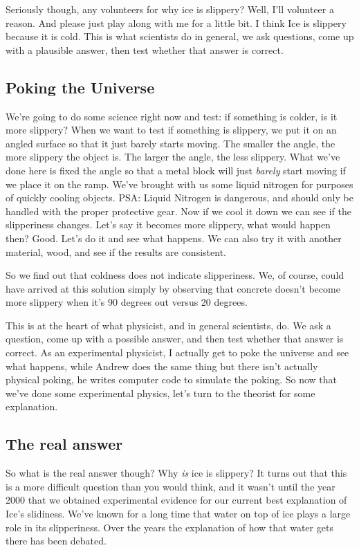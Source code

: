 \documentclass[12pt]{article}
\begin{document}
Seriously
though, any volunteers for why ice is slippery? Well, I'll volunteer a reason. And please 
just play along with me for a little bit. I think Ice is slippery because it is cold.
This is what scientists do in general, we ask questions, come up with a plausible answer, 
then test whether that answer is correct. 

\subsection{Poking the Universe}
We're going to do some science right now 
and test: if something is colder, is it more slippery? When we want to test 
if something is slippery, we put it on an angled surface so that it just barely 
starts moving. The smaller the angle, the more slippery the object is. The 
larger the angle, the less slippery. 
What we've done here is fixed the angle so that a metal block will just \emph{barely}
start moving if we place it on the ramp. We've brought with us some 
liquid nitrogen for purposes of quickly cooling objects. PSA: Liquid Nitrogen is 
dangerous, and should only be handled with the proper protective gear. 
Now if we cool it down 
we can see if the slipperiness changes. Let's say it becomes more slippery, what 
would happen then? Good. Let's do it and see what happens. 
We can also try it with another material, wood, and see if the results are 
consistent.

So we find out that coldness does not indicate slipperiness.
We, of course, could have arrived at this solution simply by observing that
concrete doesn't become more slippery when it's 90 degrees out versus 20 degrees. 

This is at the heart of what physicist, and in general scientists, do. We ask 
a question, come up with a possible answer, and then test whether that answer is
correct. As an experimental physicist, I actually get to poke the universe and
see what happens, while Andrew does the same thing but there isn't actually 
physical poking, he writes computer code to simulate the poking. So now that
we've done some experimental physics, let's turn to the theorist for some
explanation.

\subsection{The real answer}
So what is the real answer though? Why \emph{is} ice is slippery? 
It turns out that this is a more difficult question than you would think, and
it wasn't until the year 2000 that we obtained experimental evidence for our 
current best explanation of Ice's slidiness. We've known for a long time
that water on top of ice plays a large role in its slipperiness. Over the years
the explanation of how that water gets there has been debated. 
\end{document}
